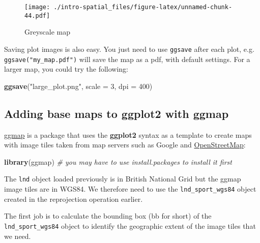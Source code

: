 \documentclass[]{article}
\newenvironment{Shaded}{}{}
\newcommand{\KeywordTok}[1]{\textcolor[rgb]{0.00,0.44,0.13}{\textbf{{#1}}}}
\newcommand{\DataTypeTok}[1]{\textcolor[rgb]{0.56,0.13,0.00}{{#1}}}
\newcommand{\DecValTok}[1]{\textcolor[rgb]{0.25,0.63,0.44}{{#1}}}
\newcommand{\StringTok}[1]{\textcolor[rgb]{0.25,0.44,0.63}{{#1}}}
\newcommand{\CommentTok}[1]{\textcolor[rgb]{0.38,0.63,0.69}{\textit{{#1}}}}
\newcommand{\NormalTok}[1]{{#1}}
\begin{document}
\begin{figure}[htbp]
\centering
\texttt{[image: ./intro-spatial\_files/figure-latex/unnamed-chunk-44.pdf]}
\caption{Greyscale map}
\end{figure}

Saving plot images is also easy. You just need to use \texttt{ggsave}
after each plot, e.g. \texttt{ggsave("my\_map.pdf")} will save the map
as a pdf, with default settings. For a larger map, you could try the
following:

\begin{Shaded}
\begin{Highlighting}[]
\KeywordTok{ggsave}\NormalTok{(}\StringTok{"large_plot.png"}\NormalTok{, }\DataTypeTok{scale =} \DecValTok{3}\NormalTok{, }\DataTypeTok{dpi =} \DecValTok{400}\NormalTok{)}
\end{Highlighting}
\end{Shaded}

\subsection{Adding base maps to ggplot2 with
ggmap}\label{adding-base-maps-to-ggplot2-with-ggmap}

\href{http://journal.r-project.org/archive/2013-1/kahle-wickham.pdf}{ggmap}
is a package that uses the \textbf{ggplot2} syntax as a template to
create maps with image tiles taken from map servers such as Google and
\href{http://www.openstreetmap.org/}{OpenStreetMap}:

\begin{Shaded}
\begin{Highlighting}[]
\KeywordTok{library}\NormalTok{(ggmap) }\CommentTok{# you may have to use install.packages to install it first}
\end{Highlighting}
\end{Shaded}

The \texttt{lnd} object loaded previously is in British National Grid
but the ggmap image tiles are in WGS84. We therefore need to use the
\texttt{lnd\_sport\_wgs84} object created in the reprojection operation
earlier.

The first job is to calculate the bounding box (bb for short) of the
\texttt{lnd\_sport\_wgs84} object to identify the geographic extent of
the image tiles that we need.
\end{document}
